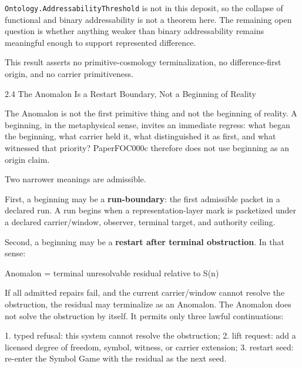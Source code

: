 \documentclass[
  10pt,
]{article}
\newenvironment{Shaded}{}{}
\newcommand{\NormalTok}[1]{#1}
\DeclareRobustCommand{\texttt}[1]{{\paperSymbolFont\nolinkurl{#1}}}
\begin{document}
\texttt{Ontology.AddressabilityThreshold} is not in this deposit, so the collapse of functional and binary addressability is not a theorem here. The remaining open question is whether anything weaker than binary addressability remains meaningful enough to support represented difference.

This result asserts no primitive-cosmology terminalization, no difference-first origin, and no carrier primitiveness.

2.4 The Anomalon Is a Restart Boundary, Not a Beginning of Reality

The Anomalon is not the first primitive thing and not the beginning of reality. A beginning, in the metaphysical sense, invites an immediate regress: what began the beginning, what carrier held it, what distinguished it as first, and what witnessed that priority? PaperFOC000c therefore does not use beginning as an origin claim.

Two narrower meanings are admissible.

First, a beginning may be a \textbf{run-boundary}: the first admissible packet in a declared run. A run begins when a representation-layer mark is packetized under a declared carrier/window, observer, terminal target, and authority ceiling.

Second, a beginning may be a \textbf{restart after terminal obstruction}. In that sense:

\begin{Shaded}
\begin{Highlighting}[]
\NormalTok{Anomalon = terminal unresolvable residual relative to S(n)}
\end{Highlighting}
\end{Shaded}

If all admitted repairs fail, and the current carrier/window cannot resolve the obstruction, the residual may terminalize as an Anomalon. The Anomalon does not solve the obstruction by itself. It permits only three lawful continuations:

\begin{Shaded}
\begin{Highlighting}[]

\NormalTok{1. typed refusal: this system cannot resolve the obstruction;}
\NormalTok{2. lift request: add a licensed degree of freedom, symbol, witness, or carrier extension;}
\NormalTok{3. restart seed: re{-}enter the Symbol Game with the residual as the next seed.}
\end{Highlighting}
\end{Shaded}
\end{document}
